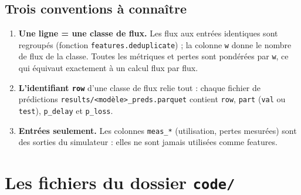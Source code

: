 \documentclass[11pt,a4paper]{article}
\newcommand{\f}[1]{\texttt{#1}}
\begin{document}
\subsection{Trois conventions à connaître}
\begin{enumerate}
  \item \textbf{Une ligne = une classe de flux.} Les flux aux entrées identiques sont regroupés (fonction \f{features.deduplicate}) ; la colonne \f{w} donne le nombre de flux de la classe. Toutes les métriques et pertes sont pondérées par \f{w}, ce qui équivaut exactement à un calcul flux par flux.
  \item \textbf{L'identifiant \f{row}} d'une classe de flux relie tout : chaque fichier de prédictions \f{results/<modèle>\_preds.parquet} contient \f{row}, \f{part} (\f{val} ou \f{test}), \f{p\_delay} et \f{p\_loss}.
  \item \textbf{Entrées seulement.} Les colonnes \f{meas\_*} (utilisation, pertes mesurées) sont des sorties du simulateur : elles ne sont jamais utilisées comme features.
\end{enumerate}

\section{Les fichiers du dossier \texttt{code/}}\label{sec:fichiers}
\end{document}
